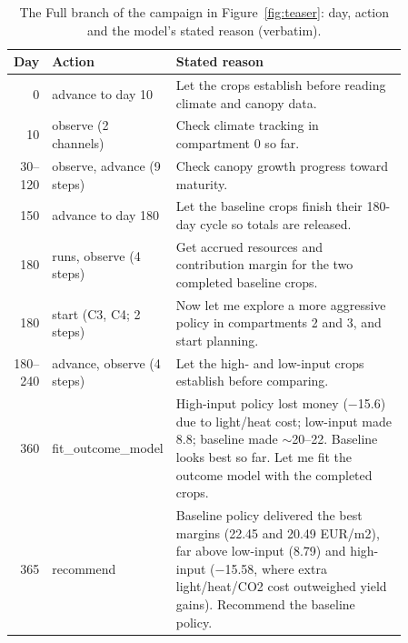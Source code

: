 \begin{table}[h]
\centering\scriptsize
\caption{The Full branch of the campaign in Figure~\ref{fig:teaser}: day, action and the model's stated reason (verbatim).}
\label{tab:trace}
\begin{tabular}{@{}r p{0.2\linewidth} p{0.66\linewidth}@{}}
\toprule
Day & Action & Stated reason \\
\midrule
0 & advance to day 10 & Let the crops establish before reading climate and canopy data. \\
10 & observe (2 channels) & Check climate tracking in compartment 0 so far. \\
30--120 & observe, advance (9 steps) & Check canopy growth progress toward maturity. \\
150 & advance to day 180 & Let the baseline crops finish their 180-day cycle so totals are released. \\
180 & runs, observe (4 steps) & Get accrued resources and contribution margin for the two completed baseline crops. \\
180 & start (C3, C4; 2 steps) & Now let me explore a more aggressive policy in compartments 2 and 3, and start planning. \\
180--240 & advance, observe (4 steps) & Let the high- and low-input crops establish before comparing. \\
360 & fit\_outcome\_model & High-input policy lost money ($-$15.6) due to light/heat cost; low-input made 8.8; baseline made $\sim$20--22. Baseline looks best so far. Let me fit the outcome model with the completed crops. \\
365 & recommend & Baseline policy delivered the best margins (22.45 and 20.49 EUR/m2), far above low-input (8.79) and high-input ($-$15.58, where extra light/heat/CO2 cost outweighed yield gains). Recommend the baseline policy. \\
\bottomrule
\end{tabular}
\end{table}

